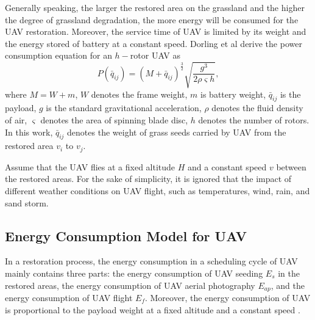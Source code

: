 \documentclass[preprint,5pt]{elsarticle}
\begin{document}
Generally speaking, the larger the restored area on the grassland and the higher the degree of grassland degradation, the more energy will be consumed for the UAV restoration. Moreover, the service time of UAV is limited by its weight and the energy stored of battery at a constant speed. Dorling et al \cite{dorling2016vehicle} derive the power consumption equation for an $h-$rotor UAV as
\begin{equation} \label{approximation-power-consumption}
P(\bar{q}_{ij}) = (M + \bar{q}_{ij})^{\frac{3}{2}}\sqrt{\frac{g^3}{2 \rho \varsigma h}},
\end{equation}
where $M = W + m$, $W$ denotes the frame weight, $m$ is battery weight, $\bar{q}_{ij}$ is the payload, $g$ is the standard gravitational acceleration, $\rho$ denotes the fluid density of air, $\varsigma$ denotes the area of spinning blade disc, $h$ denotes the number of rotors. In this work, $\bar{q}_{ij}$ denotes the weight of grass seeds carried by UAV from the restored area $v_i$ to $v_j$.

Assume that the UAV flies at a fixed altitude $H$ and a constant speed $v$ between the restored areas. For the sake of simplicity, it is ignored that the impact of different weather conditions on UAV flight, such as temperatures, wind, rain, and sand storm. %

\subsection{Energy Consumption Model for UAV} \label{Energy-Consumption-Model}
In a restoration process, the energy consumption in a scheduling cycle of UAV mainly contains three parts: the energy consumption of UAV seeding $E_s$ in the restored areas, the energy consumption of UAV aerial photography $E_{ap}$, and the energy consumption of UAV flight $E_f$. Moreover, the energy consumption of UAV is proportional to the payload weight at a fixed altitude and a constant speed \cite{dorling2016vehicle}.
\end{document}
